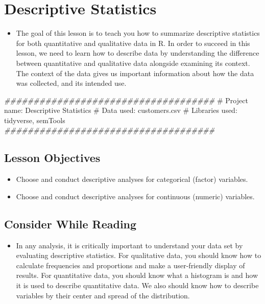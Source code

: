 \documentclass[
  letterpaper,
  DIV=11,
  numbers=noendperiod]{scrreprt}
\newenvironment{Shaded}{\begin{snugshade}}{\end{snugshade}}
\newcommand{\CommentTok}[1]{\textcolor[rgb]{0.37,0.37,0.37}{#1}}
\newcommand{\DocumentationTok}[1]{\textcolor[rgb]{0.37,0.37,0.37}{\textit{#1}}}
\providecommand{\tightlist}{%
  \setlength{\itemsep}{0pt}\setlength{\parskip}{0pt}}\usepackage{longtable,booktabs,array}
\begin{document}

\chapter{Descriptive Statistics}\label{descriptive-statistics}

\begin{itemize}
\tightlist
\item
  The goal of this lesson is to teach you how to summarize descriptive
  statistics for both quantitative and qualitative data in R. In order
  to succeed in this lesson, we need to learn how to describe data by
  understanding the difference between quantitative and qualitative data
  alongside examining its context. The context of the data gives us
  important information about how the data was collected, and its
  intended use.
\end{itemize}

\begin{Shaded}
\begin{Highlighting}[]
\DocumentationTok{\#\#\#\#\#\#\#\#\#\#\#\#\#\#\#\#\#\#\#\#\#\#\#\#\#\#\#\#\#\#\#\#\#\#\#\#}
\CommentTok{\# Project name: Descriptive Statistics}
\CommentTok{\# Data used: customers.csv}
\CommentTok{\# Libraries used: tidyverse, semTools}
\DocumentationTok{\#\#\#\#\#\#\#\#\#\#\#\#\#\#\#\#\#\#\#\#\#\#\#\#\#\#\#\#\#\#\#\#\#\#\#\#}
\end{Highlighting}
\end{Shaded}

\section{Lesson Objectives}\label{lesson-objectives-1}

\begin{itemize}
\tightlist
\item
  Choose and conduct descriptive analyses for categorical (factor)
  variables.
\item
  Choose and conduct descriptive analyses for continuous (numeric)
  variables.
\end{itemize}

\section{Consider While Reading}\label{consider-while-reading-1}

\begin{itemize}
\tightlist
\item
  In any analysis, it is critically important to understand your data
  set by evaluating descriptive statistics. For qualitative data, you
  should know how to calculate frequencies and proportions and make a
  user-friendly display of results. For quantitative data, you should
  know what a histogram is and how it is used to describe quantitative
  data. We also should know how to describe variables by their center
  and spread of the distribution.
\end{itemize}
\end{document}
